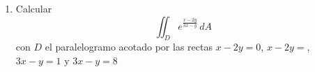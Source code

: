 \documentclass{article}
\begin{document}
\begin{enumerate}
        \item {
            Calcular
            \[
                \iint_{D}{e^{\frac{x-2y}{3x-y}}\,dA}
            \]
            con $D$ el paralelogramo acotado por las rectas $x-2y=0$, $x-2y=$,
            $3x-y=1$ y $3x-y=8$

            \color{azul}




}
\end{enumerate}
\end{document}
